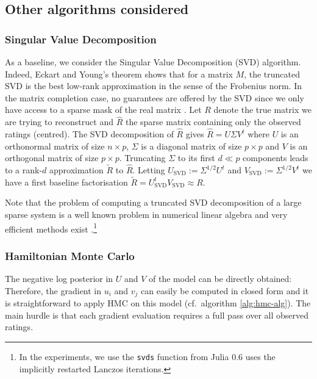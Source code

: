 

\subsection{Other algorithms considered}

\subsubsection{Singular Value Decomposition}

As a baseline, we consider the Singular Value Decomposition (SVD) algorithm. Indeed, Eckart and Young's theorem shows that for a matrix $M$, the truncated SVD is the best low-rank approximation in the sense of the Frobenius norm. In the matrix completion case, no guarantees are offered by the SVD since we only have access to a sparse mask of the real matrix \citep{srebro04}. Let $R$ denote the true matrix we are trying to reconstruct and $\hat R$ the sparse matrix containing only the observed ratings (centred). The SVD decomposition of $\hat R$ gives $\hat R = U\Sigma V^{t}$ where $U$ is an orthonormal matrix of size $n\times p$, $\Sigma$ is a diagonal matrix of size $p\times p$ and $V$ is an orthogonal matrix of size $p\times p$. Truncating $\Sigma$ to its first $d\ll p$ components leads to a rank-$d$ approximation $\tilde R$ to $\hat R$. 
Letting $U_{\text{SVD}}:=\Sigma^{1/2}U^{t}$ and $V_{\text{SVD}}:=\Sigma^{1/2}V^{t}$ we have a first baseline factorisation $\tilde R=U_{\text{SVD}}^{t}V_{\text{SVD}}\approx R$.

Note that the problem of computing a truncated SVD decomposition of a large sparse system is a well known problem in numerical linear algebra and very efficient methods exist \citep{sorensen96}.\footnote{In the experiments, we use the \texttt{svds} function from Julia 0.6 uses the implicitly restarted Lanczos iterations.}

\subsubsection{Hamiltonian Monte Carlo}

The negative log posterior in $U$ and $V$ of the model can be directly obtained:
Therefore, the gradient in $u_{i}$ and $v_{j}$ can easily be computed in closed form and it is straightforward to apply HMC on this model (cf.\ algorithm \ref{alg:hmc-alg}). The main hurdle is that each gradient evaluation requires a full pass over all observed ratings. 

